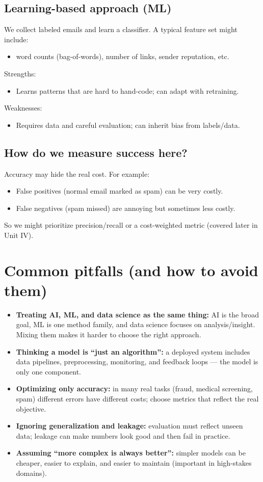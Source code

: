 \documentclass[11pt]{article}
\begin{document}
\subsection{Learning-based approach (ML)}
We collect labeled emails and learn a classifier. A typical feature set might include:
\begin{itemize}[leftmargin=*]
  \item word counts (bag-of-words), number of links, sender reputation, etc.
\end{itemize}
Strengths:
\begin{itemize}[leftmargin=*]
  \item Learns patterns that are hard to hand-code; can adapt with retraining.
\end{itemize}
Weaknesses:
\begin{itemize}[leftmargin=*]
  \item Requires data and careful evaluation; can inherit bias from labels/data.
\end{itemize}

\subsection{How do we measure success here?}
Accuracy may hide the real cost. For example:
\begin{itemize}[leftmargin=*]
  \item False positives (normal email marked as spam) can be very costly.
  \item False negatives (spam missed) are annoying but sometimes less costly.
\end{itemize}
So we might prioritize precision/recall or a cost-weighted metric (covered later in Unit IV).

\section{Common pitfalls (and how to avoid them)}
\begin{itemize}[leftmargin=*]
  \item \textbf{Treating AI, ML, and data science as the same thing:} AI is the broad goal, ML is one method family, and data science focuses on analysis/insight. Mixing them makes it harder to choose the right approach.
  \item \textbf{Thinking a model is ``just an algorithm'':} a deployed system includes data pipelines, preprocessing, monitoring, and feedback loops --- the model is only one component.
  \item \textbf{Optimizing only accuracy:} in many real tasks (fraud, medical screening, spam) different errors have different costs; choose metrics that reflect the real objective.
  \item \textbf{Ignoring generalization and leakage:} evaluation must reflect unseen data; leakage can make numbers look good and then fail in practice.
  \item \textbf{Assuming ``more complex is always better'':} simpler models can be cheaper, easier to explain, and easier to maintain (important in high-stakes domains).
\end{itemize}
\end{document}
